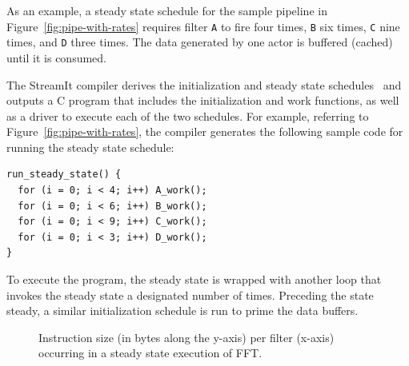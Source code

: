 As an example, a steady state schedule for the sample pipeline in
Figure~\ref{fig:pipe-with-rates} requires filter \texttt{A} to fire
four times, \texttt{B} six times, \texttt{C} nine times, and
\texttt{D} three times. 
The data generated by one actor is buffered (cached) until it is
consumed.

The StreamIt compiler derives the initialization and steady state
schedules~\cite{karczma-lctes03} and outputs a C program that includes
the initialization and work functions, as well as a driver to execute
each of the two schedules. For example, referring to
Figure~\ref{fig:pipe-with-rates}, the compiler generates the following
sample code for running the steady state schedule:
\begin{verbatim}
run_steady_state() {
  for (i = 0; i < 4; i++) A_work();
  for (i = 0; i < 6; i++) B_work();
  for (i = 0; i < 9; i++) C_work();
  for (i = 0; i < 3; i++) D_work();
}
\end{verbatim}
To execute the program, the steady state is wrapped with
another loop that invokes the steady state a designated number of
times. Preceding the state steady, a similar initialization schedule
is run to prime the data buffers.

\begin{figure}[t]
\begin{center}
\vspace{-12pt}
 \vspace{-6pt}
 \caption{Instruction size (in bytes along the y-axis) per filter
 (x-axis) occurring in a steady state execution of FFT.}
 \label{fig:ssi-single}
\vspace{-18pt}
\end{center}
\end{figure}

